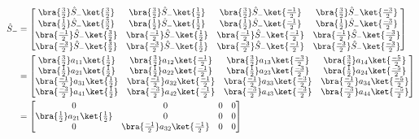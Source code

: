\documentclass{article}
\begin{document}
\begin{enumerate}
		\begin{align}
			\hat{S}_- &=
			\begin{bmatrix}
				\bra{\frac{3}{2}} \hat{S}_- \ket{\frac{3}{2}} & \bra{\frac{3}{2}} \hat{S}_- \ket{\frac{1}{2}} &
				\bra{\frac{3}{2}} \hat{S}_- \ket{\frac{-1}{2}} & \bra{\frac{3}{2}} \hat{S}_- \ket{\frac{-3}{2}} \\
				\bra{\frac{1}{2}} \hat{S}_- \ket{\frac{3}{2}} & \bra{\frac{1}{2}} \hat{S}_- \ket{\frac{1}{2}} &
				\bra{\frac{1}{2}} \hat{S}_- \ket{\frac{-1}{2}} & \bra{\frac{1}{2}} \hat{S}_- \ket{\frac{-3}{2}} \\
				\bra{\frac{-1}{2}} \hat{S}_- \ket{\frac{3}{2}} & \bra{\frac{-1}{2}} \hat{S}_- \ket{\frac{1}{2}} &
				\bra{\frac{-1}{2}} \hat{S}_- \ket{\frac{-1}{2}} & \bra{\frac{-1}{2}} \hat{S}_- \ket{\frac{-3}{2}} \\
				\bra{\frac{-3}{2}} \hat{S}_- \ket{\frac{3}{2}} & \bra{\frac{-3}{2}} \hat{S}_- \ket{\frac{1}{2}} &
				\bra{\frac{-3}{2}} \hat{S}_- \ket{\frac{-1}{2}} & \bra{\frac{-3}{2}} \hat{S}_- \ket{\frac{-3}{2}} \\
			\end{bmatrix} \\
			&=
			\begin{bmatrix}
				\bra{\frac{3}{2}} a_{11} \ket{\frac{1}{2}} & \bra{\frac{3}{2}} a_{12} \ket{\frac{-1}{2}} &
				\bra{\frac{3}{2}} a_{13} \ket{\frac{-3}{2}} & \bra{\frac{3}{2}} a_{14} \ket{\frac{-5}{2}} \\
				\bra{\frac{1}{2}} a_{21} \ket{\frac{1}{2}} & \bra{\frac{1}{2}} a_{22} \ket{\frac{-1}{2}} &
				\bra{\frac{1}{2}} a_{23} \ket{\frac{-3}{2}} & \bra{\frac{1}{2}} a_{24} \ket{\frac{-5}{2}} \\
				\bra{\frac{-1}{2}} a_{31} \ket{\frac{1}{2}} & \bra{\frac{-1}{2}} a_{32} \ket{\frac{-1}{2}} &
				\bra{\frac{-1}{2}} a_{33} \ket{\frac{-3}{2}} & \bra{\frac{-1}{2}} a_{34} \ket{\frac{-5}{2}} \\
				\bra{\frac{-3}{2}} a_{41} \ket{\frac{1}{2}} & \bra{\frac{-3}{2}} a_{42} \ket{\frac{-1}{2}} &
				\bra{\frac{-3}{2}} a_{43} \ket{\frac{-3}{2}} & \bra{\frac{-3}{2}} a_{44} \ket{\frac{-5}{2}} \\
			\end{bmatrix} \\
			&=
			\begin{bmatrix}
				0 & 0 & 0 & 0 \\
				\bra{\frac{1}{2}} a_{21} \ket{\frac{1}{2}} & 0 & 0 & 0 \\
				0 & \bra{\frac{-1}{2}} a_{32} \ket{\frac{-1}{2}} & 0 & 0 \\

\end{bmatrix}
\end{align}
\end{enumerate}
\end{document}
